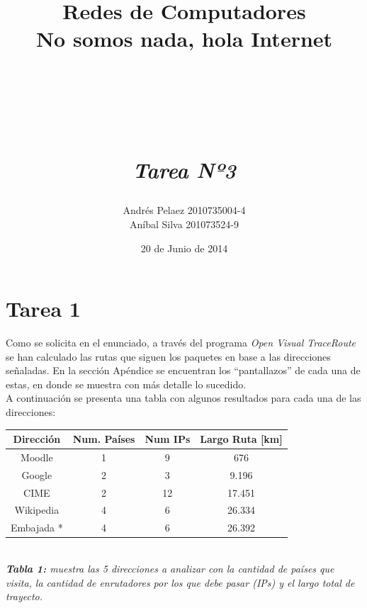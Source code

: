 \documentclass[letterpaper,10pt,onecolumn,titlepage]{article}
\author{Andrés Pelaez 2010735004-4 \\ Aníbal Silva 201073524-9}
\title{\begin{Huge}
Redes de Computadores\\
    No somos nada, hola Internet\\
\end{Huge}
    ~\\
    ~\\
    ~\\
    \emph{Tarea Nº3}}
\date{20 de Junio de 2014}
\begin{document}
 
\renewcommand{\listtablename}{Índice de tablas}
\renewcommand{\tablename}{Tabla}
\maketitle
\setcounter{page}{2}
\tableofcontents{}
\thispagestyle{empty}
\newpage
\fancyhead{}
\fancyfoot{}
 
\rfoot{\thepage}
 
\section{Tarea 1}
 
Como se solicita en el enunciado, a través del programa \textit{Open Visual TraceRoute} se han calculado las rutas que siguen los paquetes en base a las direcciones señaladas. En la sección Apéndice se encuentran los “pantallazos” de cada una de estas, en donde se muestra con más detalle lo sucedido. \\

A continuación se presenta una tabla con algunos resultados para cada una de las direcciones:

\begin{center}

   \begin{tabular}{|c|c|c|c|} \hline
     Dirección & Num. Países & Num IPs & Largo Ruta [km] \\ \hline
     Moodle    & 1           & 9       & 676             \\ \hline
     Google    & 2           & 3       & 9.196           \\ \hline
     CIME      & 2           & 12      & 17.451          \\ \hline
     Wikipedia & 4           & 6       & 26.334          \\ \hline
     Embajada *  & 4           & 6       & 26.392               \\ \hline
   \end{tabular}\\
   
   \textit{\textbf{Tabla 1:} muestra las 5 direcciones a analizar con la cantidad de países que visita, la cantidad de enrutadores por los que debe pasar (IPs) y el largo total de trayecto.}
 \end{center}
\end{document}
